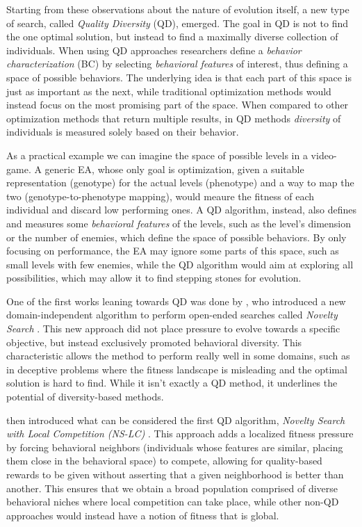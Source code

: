 \documentclass{Configuration_Files/PoliMi3i_thesis}
\begin{document}
Starting from these observations about the nature of evolution itself, a new type of search, called \textit{Quality Diversity} (QD), emerged. The goal in QD is not to find the one optimal solution, but instead to find a maximally diverse collection of individuals. When using QD approaches researchers define a \textit{behavior characterization} (BC) by selecting \textit{behavioral features} of interest, thus defining a space of possible behaviors. The underlying idea is that each part of this space is just as important as the next, while traditional optimization methods would instead focus on the most promising part of the space. When compared to other optimization methods that return multiple results, in QD methods \textit{diversity} of individuals is measured solely based on their behavior. \cite{pugh_quality_2016}  

As a practical example we can imagine the space of possible levels in a video-game. A generic EA, whose only goal is optimization, given a suitable representation (genotype) for the actual levels (phenotype) and a way to map the two (genotype-to-phenotype mapping), would meaure the fitness of each individual and discard low performing ones. A QD algorithm, instead, also defines and measures some \textit{behavioral features} of the levels, such as the level's dimension or the number of enemies, which define the space of possible behaviors. By only focusing on performance, the EA may ignore some parts of this space, such as small levels with few enemies, while the QD algorithm would aim at exploring all possibilities, which may allow it to find stepping stones for evolution.

One of the first works leaning towards QD was done by \citeauthor{lehman_exploiting_2008}, who introduced a new domain-independent algorithm to perform open-ended searches called \textit{Novelty Search} \cite{lehman_exploiting_2008}. This new approach did not place pressure to evolve towards a specific objective, but instead exclusively promoted behavioral diversity. This characteristic allows the method to perform really well in some domains, such as in deceptive problems where the fitness landscape is misleading and the optimal solution is hard to find. While it isn't exactly a QD method, it underlines the potential of diversity-based methods. 

 then introduced what can be considered the first QD algorithm, \textit{Novelty Search with Local Competition (NS-LC)} \cite{lehman_evolving_2011}. This approach adds a localized fitness pressure by forcing behavioral neighbors (individuals whose features are similar, placing them close in the behavioral space) to compete, allowing for quality-based rewards to be given without asserting that a given neighborhood is better than another. This ensures that we obtain a broad population comprised of diverse behavioral niches where local competition can take place, while other non-QD approaches would instead have a notion of fitness that is global. 
\end{document}
